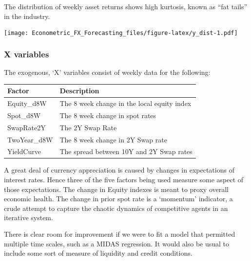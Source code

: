 \documentclass[]{article}
\newenvironment{Shaded}{\begin{snugshade}}{\end{snugshade}}
\newcommand{\KeywordTok}[1]{\textcolor[rgb]{0.13,0.29,0.53}{\textbf{#1}}}
\newcommand{\DataTypeTok}[1]{\textcolor[rgb]{0.13,0.29,0.53}{#1}}
\newcommand{\FloatTok}[1]{\textcolor[rgb]{0.00,0.00,0.81}{#1}}
\newcommand{\StringTok}[1]{\textcolor[rgb]{0.31,0.60,0.02}{#1}}
\newcommand{\OperatorTok}[1]{\textcolor[rgb]{0.81,0.36,0.00}{\textbf{#1}}}
\newcommand{\NormalTok}[1]{#1}
\begin{document}
The distribution of weekly asset returns shows high kurtosis, known as
``fat tails'' in the industry.

\begin{Shaded}
\end{Shaded}

\texttt{[image: Econometric\_FX\_Forecasting\_files/figure-latex/y\_dist-1.pdf]}

\subsubsection{X variables}\label{x-variables}

The exogenous, `X' variables consist of weekly data for the following:

\begin{longtable}[]{@{}ll@{}}
\toprule
Factor & Description\tabularnewline
\midrule
\endhead
Equity\_d8W & The 8 week change in the local equity index\tabularnewline
Spot\_d8W & The 8 week change in spot rates\tabularnewline
SwapRate2Y & The 2Y Swap Rate\tabularnewline
TwoYear\_d8W & The 8 week change in 2Y Swap rate\tabularnewline
YieldCurve & The spread between 10Y and 2Y Swap rates\tabularnewline
\bottomrule
\end{longtable}

A great deal of currency appreciation is caused by changes in
expectations of interest rates. Hence three of the five factors being
used measure some aspect of those expectations. The change in Equity
indexes is meant to proxy overall economic health. The change in prior
spot rate is a `momentum' indicator, a crude attempt to capture the
chaotic dynamics of competitive agents in an iterative system.

There is clear room for improvement if we were to fit a model that
permitted multiple time scales, such as a MIDAS regression. It would
also be usual to include some sort of measure of liquidity and credit
conditions.
\end{document}
